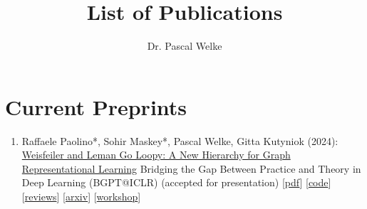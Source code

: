 \documentclass{scrartcl}
\author{Dr. Pascal Welke}
\title{List of Publications}
\begin{document}
\setcounter{saveenumi}{0}
\newcommand{\seti}{\setcounter{saveenumi}{\value{enumi}}}
\newcommand{\conti}{\setcounter{enumi}{\value{saveenumi}}}


\section{Current Preprints}
\begin{enumerate}
\conti
\item
\label{maskey2024loopybgpt}
Raffaele Paolino*, Sohir Maskey*, Pascal Welke, Gitta Kutyniok (2024):\newline
\href{https://pwelke.github.io/publications/paolino2024loopyarxiv.pdf}{Weisfeiler and Leman Go Loopy: A New Hierarchy for Graph Representational Learning}\newline
Bridging the Gap Between Practice and Theory in Deep Learning (BGPT@ICLR)\newline
(accepted for presentation)\newline
{\footnotesize
[\href{https://pwelke.github.io/publications/paolino2024loopyarxiv.pdf}{pdf}]
[\href{https://github.com/RPaolino/loopy}{code}]
[\href{https://openreview.net/forum?id=ESTxJjN3tE}{reviews}]
[\href{https://arxiv.org/abs/2403.13749}{arxiv}]
[\href{https://sites.google.com/view/bgpt-iclr24/home}{workshop}]
}
\seti
\end{enumerate}
\end{document}
